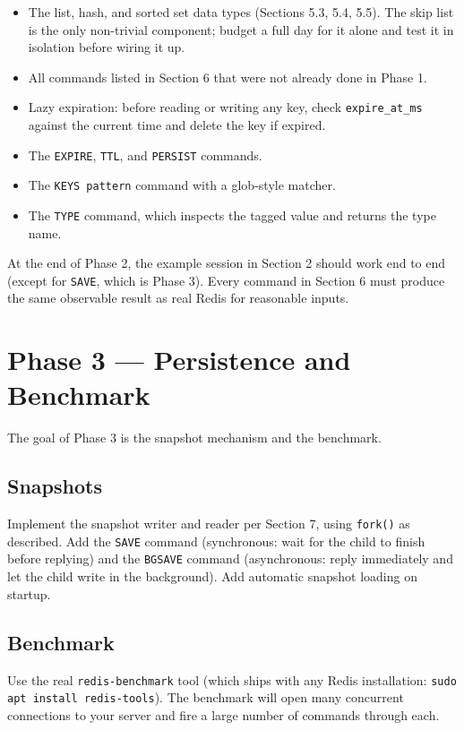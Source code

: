 \documentclass[11pt,a4paper]{article}
\begin{document}
\begin{itemize}
\item The list, hash, and sorted set data types (Sections 5.3, 5.4, 5.5). The skip list is the only non-trivial component; budget a full day for it alone and test it in isolation before wiring it up.

\item All commands listed in Section 6 that were not already done in Phase 1.

\item Lazy expiration: before reading or writing any key, check \texttt{expire\_at\_ms} against the current time and delete the key if expired.

\item The \texttt{EXPIRE}, \texttt{TTL}, and \texttt{PERSIST} commands.

\item The \texttt{KEYS pattern} command with a glob-style matcher.

\item The \texttt{TYPE} command, which inspects the tagged value and returns the type name.
\end{itemize}

At the end of Phase 2, the example session in Section 2 should work end to end (except for \texttt{SAVE}, which is Phase 3). Every command in Section 6 must produce the same observable result as real Redis for reasonable inputs.

\section{Phase 3 --- Persistence and Benchmark}

The goal of Phase 3 is the snapshot mechanism and the benchmark.

\subsection{Snapshots}
Implement the snapshot writer and reader per Section 7, using \texttt{fork()} as described. Add the \texttt{SAVE} command (synchronous: wait for the child to finish before replying) and the \texttt{BGSAVE} command (asynchronous: reply immediately and let the child write in the background). Add automatic snapshot loading on startup.

\subsection{Benchmark}
Use the real \texttt{redis-benchmark} tool (which ships with any Redis installation: \texttt{sudo apt install redis-tools}). The benchmark will open many concurrent connections to your server and fire a large number of commands through each.
\end{document}
